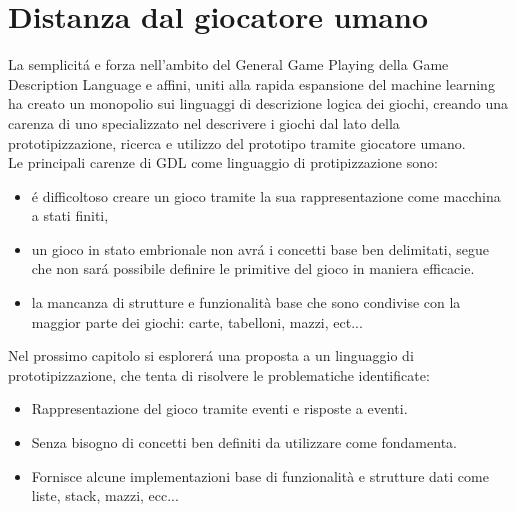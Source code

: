 \section{Distanza dal giocatore umano}
La semplicitá e forza nell'ambito del General Game Playing della Game Description Language e affini, 
uniti alla rapida espansione del machine learning ha creato un monopolio sui linguaggi di descrizione
logica dei giochi, creando una carenza di uno specializzato nel descrivere i giochi dal
lato della prototipizzazione, ricerca e utilizzo del prototipo tramite giocatore umano. \\ 
Le principali carenze di GDL come linguaggio di protipizzazione sono:
\begin{itemize}
    \item { 
        é difficoltoso creare un gioco tramite la sua rappresentazione come macchina a stati finiti, 
    }
    \item {
        un gioco in stato embrionale non avrá i concetti base ben delimitati, segue che non sará 
        possibile definire le primitive del gioco in maniera efficacie.
    }
    \item {
        la mancanza di strutture e funzionalità base che sono condivise con la maggior parte dei         
        giochi: carte, tabelloni, mazzi, ect...
    }
\end{itemize}
Nel prossimo capitolo si esplorerá una proposta a un linguaggio di prototipizzazione, che 
tenta di risolvere le problematiche identificate:
\begin{itemize}
    \item Rappresentazione del gioco tramite eventi e risposte a eventi.
    \item Senza bisogno di concetti ben definiti da utilizzare come fondamenta.
    \item Fornisce alcune implementazioni base di funzionalità e strutture dati come liste, stack, mazzi, ecc... 
\end{itemize}